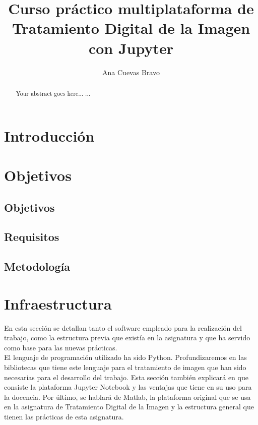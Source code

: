 \documentclass[a4paper,12pt]{report}
\begin{document}
\title{Curso práctico multiplataforma de Tratamiento Digital de la Imagen con Jupyter}
\author{ Ana Cuevas Bravo}
\maketitle

\newpage
{}

\renewcommand{\abstractname}{Resumen}
\renewcommand{\chaptername}{Capítulo}
\renewcommand{\chaptername}{Capítulo}

\begin{abstract}
Your abstract goes here...
...
\end{abstract}


\tableofcontents
\newpage
{}

\chapter{Introducción}
\chapter{Objetivos}
\section{Objetivos}
\section{Requisitos}
\section{Metodología}
\chapter{Infraestructura}

En esta sección se detallan tanto el software empleado para la realización del trabajo, como la estructura previa que existía en la asignatura y que ha servido como base para las nuevas prácticas. \\

 El lenguaje de programación utilizado ha sido Python. Profundizaremos en las bibliotecas que tiene este lenguaje para el tratamiento de imagen que han sido necesarias para el desarrollo del trabajo. Esta sección también explicará en que consiste la plataforma Jupyter Notebook y las ventajas que tiene en su uso para la docencia. Por último, se hablará de Matlab, la plataforma original que se usa en la asignatura de Tratamiento Digital de la Imagen y la estructura general que tienen las prácticas de esta asignatura.
\end{document}
